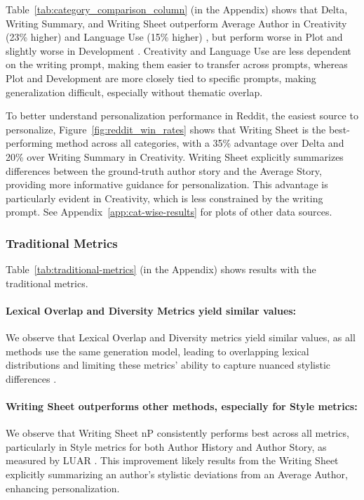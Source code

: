 Table~\ref{tab:category_comparison_column} (in the Appendix) shows that Delta, Writing Summary, and Writing Sheet outperform Average Author in Creativity (23\% higher) and Language Use (15\% higher) \citep{huot2024agents}, but perform worse in Plot and slightly worse in Development \citep{tian-etal-2024-large-language, xu2024echoes}. Creativity and Language Use are less dependent on the writing prompt, making them easier to transfer across prompts, whereas Plot and Development are more closely tied to specific prompts, making generalization difficult, especially without thematic overlap.  

To better understand personalization performance in Reddit, the easiest source to personalize, Figure~\ref{fig:reddit_win_rates} shows that Writing Sheet is the best-performing method across all categories, with a 35\% advantage over Delta and 20\% over Writing Summary in Creativity. Writing Sheet explicitly summarizes differences between the ground-truth author story and the Average Story, providing more informative guidance for personalization. This advantage is particularly evident in Creativity, which is less constrained by the writing prompt. See Appendix~\ref{app:cat-wise-results} for plots of other data sources.

\subsubsection{Traditional Metrics}  
Table~\ref{tab:traditional-metrics} (in the Appendix) shows results with the traditional metrics. 

\paragraph{Lexical Overlap and Diversity Metrics yield similar values:}
We observe that Lexical Overlap and Diversity metrics yield similar values, as all methods use the same generation model, leading to overlapping lexical distributions and limiting these metrics' ability to capture nuanced stylistic differences \citep{zheng2023judging, xie-etal-2023-next}. 

\paragraph{Writing Sheet outperforms other methods, especially for Style metrics:} We observe that Writing Sheet nP consistently performs best across all metrics, particularly in Style metrics for both Author History and Author Story, as measured by LUAR \citep{rivera-soto-etal-2021-learning}. This improvement likely results from the Writing Sheet explicitly summarizing an author's stylistic deviations from an Average Author, enhancing personalization.


